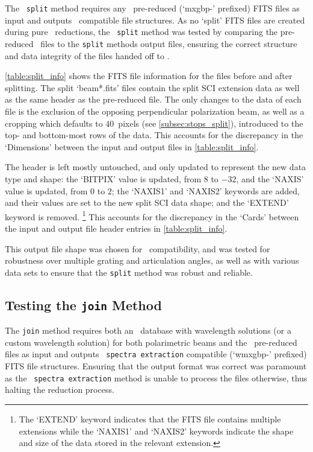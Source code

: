 The \stops\ \texttt{split} method requires any \polsalt\ pre-reduced (`mxgbp-' prefixed) \gls{FITS} files as input and outputs \iraf\ compatible file structures. As no `split' \gls{FITS} files are created during pure \polsalt\ reductions, the \stops\ \texttt{split} method was tested by comparing the pre-reduced \polsalt\ files to the \texttt{split} methods output files, ensuring the correct structure and data integrity of the files handed off to \iraf.



\autoref{table:split_info} shows the \gls{FITS} file information for the files before and after splitting. The split `beam*.fits' files contain the split \gls{SCI} extension data as well as the same header as the pre-reduced file. The only changes to the data of each file is the exclusion of the opposing perpendicular polarization beam, as well as a cropping which defaults to $40$~pixels (see \autoref{subsec:stops_split}), introduced to the top- and bottom-most rows of the data. This accounts for the discrepancy in the `Dimensions' between the input and output files in \autoref{table:split_info}.

The header is left mostly untouched, and only updated to represent the new data type and shape:
the `BITPIX' value is updated, from $8$ to $-32$, and the `NAXIS' value is updated, from $0$ to $2$;
the `NAXIS1' and `NAXIS2' keywords are added, and their values are set to the new split \gls{SCI} data shape;
and the `EXTEND' keyword is removed.%
\footnote{The `EXTEND' keyword indicates that the \gls{FITS} file contains multiple extensions while the `NAXIS1' and `NAXIS2' keywords indicate the shape and size of the data stored in the relevant extension.}
This accounts for the discrepancy in the `Cards' between the input and output file header entries in \autoref{table:split_info}.

This output file shape was chosen for \iraf\ compatibility, and was tested for robustness over multiple grating and articulation angles, as well as with various data sets to ensure that the \texttt{split} method was robust and reliable.

\subsection{Testing the \texttt{join} Method} \label{subsec:test_join}

The \texttt{join} method requires both an \iraf\ database with wavelength solutions (or a custom wavelength solution) for both polarimetric beams and the \polsalt\ pre-reduced files as input and outputs \polsalt\ \texttt{spectra extraction} compatible (`wmxgbp-' prefixed) \gls{FITS} file structures. Ensuring that the output format was correct was paramount as the \polsalt\ \texttt{spectra extraction} method is unable to process the files otherwise, thus halting the reduction process.


